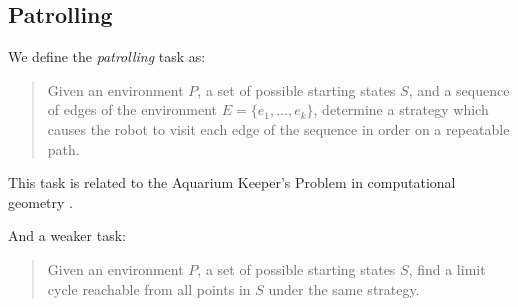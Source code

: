 \documentclass[]{styles/svproc}  %
\begin{document}

%



%
%


\subsection{Patrolling}

We define the \emph{patrolling} task as:

\begin{quotation}
Given an environment $P$, a set of possible starting states $S$, and
a sequence of edges of the environment $E = \{e_1, \ldots, e_k\}$,
determine a strategy which causes the robot to visit each edge of the sequence
in order on a repeatable path.
\end{quotation}

This task is related to the Aquarium Keeper's Problem in computational
geometry \cite{czyzowicz1991aquarium}.

And a weaker task:

\begin{quotation}
Given an environment $P$, a set of possible starting states $S$, find a limit
cycle reachable from all points in $S$ under the same strategy.
\end{quotation}
\end{document}
